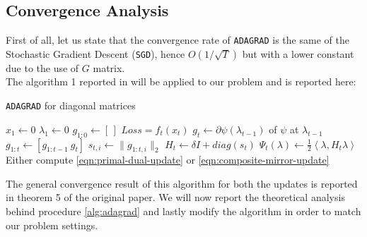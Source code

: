 \documentclass[notitlepage]{article}
\begin{document}
\subsection{Convergence Analysis}
\label{sec:convergence}
First of all, let us state that the convergence rate of \texttt{ADAGRAD} is the same of the Stochastic Gradient Descent (\texttt{SGD}), hence $O(1/\sqrt{T})$ but with a lower constant due to the use of $G$ matrix.\\
The algorithm 1 reported in \cite{JMLR:v12:duchi11a} will be applied to our problem and is reported here:
\begin{flushleft}
  \begin{minipage}{\textwidth}
    \begin{algorithm}[H]
      \caption{\texttt{ADAGRAD} for diagonal matrices}
      \label{alg:adagrad}
      \begin{algorithmic}
          \State $x_1 \gets 0$
          \State $\lambda_1 \gets 0$
          \State $g_{1:0} \gets \left[\,\right]$
            \State $Loss = f_t(x_t)$
            \State $g_t \gets \partial \psi(\lambda_{t-1})$ of $\psi$ at $\lambda_{t-1}$
            \State $g_{1:t} \gets \left[ g_{1:t-1}\ g_t \right]$
            \State $s_{t,i} \gets \| g_{1:t,i} \|_2$
            \State $H_t \gets \delta \mathit{I} + diag(s_t)$
            \State $\Psi_t(\lambda) \gets \frac{1}{2} \left\langle \lambda,H_t \lambda \right\rangle$
            \State Either compute \eqref{eqn:primal-dual-update} or \eqref{eqn:composite-mirror-update} 
          \EndFor
        \EndFunction
      \end{algorithmic}  
    \end{algorithm}
  \end{minipage}
\end{flushleft}
The general convergence result of this algorithm for both the updates is reported in theorem 5 of the original paper. We will now report the theoretical analysis behind procedure \ref{alg:adagrad} and lastly modify the algorithm in order to match our problem settings.
\end{document}
